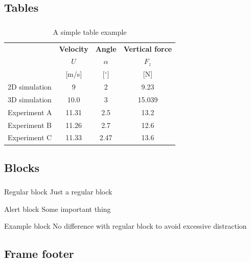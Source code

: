 \subsection{Tables}
\begin{frame}
  \frametitle{\insertsectionhead}
  \framesubtitle{\insertsubsectionhead}
  \begin{table}[H]
    \centering
    \caption{A simple table example}
    \begin{tabular}{@{} lccc @{}}
      \toprule
      & \textbf{Velocity} & \textbf{Angle}  & \textbf{Vertical force} \\
      & $U$ & $\alpha$  & $F_z$ \\
      & [m/s] & [$^\circ$]  & [N] \\
      \midrule
      2D simulation  & 9 & 2 & 9.23 \\
      3D simulation  & 10.0 & 3 & 15.039 \\
      Experiment A   & 11.31 & 2.5 & 13.2 \\
      Experiment B   & 11.26 & 2.7 & 12.6 \\
      Experiment C   & 11.33 & 2.47 & 13.6 \\
      \bottomrule
    \end{tabular}
  \end{table}

\end{frame}

\subsection{Blocks}
\begin{frame}
  \frametitle{\insertsectionhead}
  \framesubtitle{\insertsubsectionhead}
  \begin{block}{Regular block}
    Just a regular block
  \end{block}
  \begin{alertblock}{Alert block}
    Some important thing
  \end{alertblock}
  \begin{exampleblock}{Example block}
    No difference with regular block to avoid excessive distraction
  \end{exampleblock}
\end{frame}

\subsection{Frame footer}

